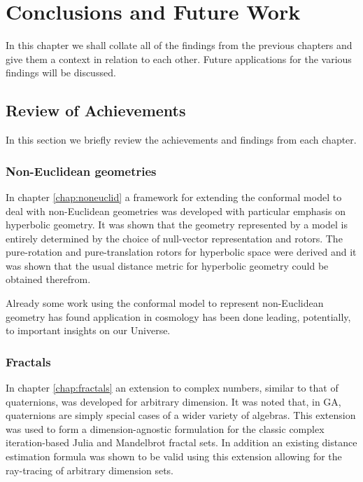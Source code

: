 \chapter{Conclusions and Future Work}

In this chapter we shall collate all of the findings from the previous chapters
and give them a context in relation to each other. Future applications for
the various findings will be discussed.

\section{Review of Achievements}

In this section we briefly review the achievements and findings from each
chapter.

\subsection{Non-Euclidean geometries}

In chapter \ref{chap:noneuclid} a framework for extending the conformal
model to deal with non-Euclidean geometries was developed with particular
emphasis on hyperbolic geometry. It was shown that the geometry
represented by a model is entirely determined by the choice of null-vector
representation and rotors. The pure-rotation and pure-translation 
rotors for hyperbolic space were derived and it was shown that the usual
distance metric for hyperbolic geometry could be obtained therefrom.

Already some work using the conformal model to represent non-Euclidean geometry
has found application in cosmology\cite{GA:SIGKEY} has been done leading, potentially, to important insights on
our Universe.

\subsection{Fractals}

In chapter \ref{chap:fractals} an extension to complex numbers, similar to that
of quaternions, was developed for arbitrary dimension. It was noted that, in
GA, quaternions are simply special cases of a wider variety of algebras. This
extension was used to form a dimension-agnostic formulation for the classic
complex iteration-based Julia and Mandelbrot fractal sets. In addition an
existing distance estimation formula was shown to be valid using this extension
allowing for the ray-tracing of arbitrary dimension sets.

